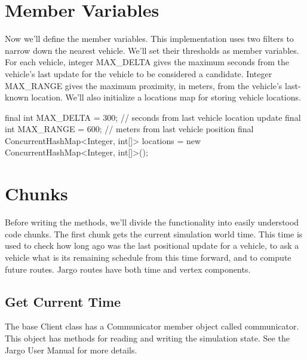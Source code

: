 \section{Member Variables}
\label{client-nearest: member-variables}

Now we'll define the member variables. This implementation uses two filters to
narrow down the nearest vehicle. We'll set their thresholds as member
variables. For each vehicle, integer {\Tt{}MAX{\_}DELTA\nwendquote} gives the maximum seconds
from the vehicle's last update for the vehicle to be considered a candidate.
Integer {\Tt{}MAX{\_}RANGE\nwendquote} gives the maximum proximity, in meters, from the
vehicle's last-known location. We'll also initialize a {\Tt{}locations\nwendquote} map for
storing vehicle locations.

\nwenddocs{}\endmoddef\nwstartdeflinemarkup{}\nwenddeflinemarkup
final int MAX_DELTA = 300;  // seconds from last vehicle location update
final int MAX_RANGE = 600;  // meters from last vehicle position
final ConcurrentHashMap<Integer, int[]> locations =
  new ConcurrentHashMap<Integer, int[]>();
\nwendcode{}\nwdocspar

\section{Chunks}
\label{NearestNeighbor: chunks}

Before writing the methods, we'll divide the functionality into easily
understood code chunks. The first chunk gets the current simulation world time.
This time is used to check how long ago was the last positional update for a
vehicle, to ask a vehicle what is its remaining schedule from this time
forward, and to compute future routes. Jargo routes have both time and vertex
components.

\subsection{Get Current Time}

The base {\Tt{}Client\nwendquote} class has a {\Tt{}Communicator\nwendquote} member object called
{\Tt{}communicator\nwendquote}. This object has methods for reading and writing the
simulation state. See the Jargo User Manual for more details.

